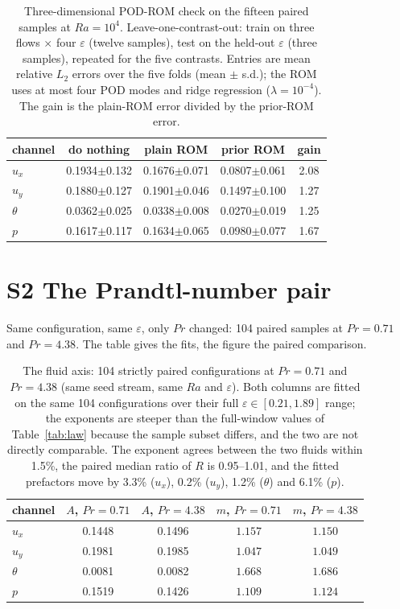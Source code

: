 \documentclass[preprint,11pt,a4paper,times,doubleblind]{elsarticle}
\begin{document}
\begin{table}[htbp]
\centering
\small
\caption{Three-dimensional POD-ROM check on the fifteen paired samples at $Ra=10^4$.
Leave-one-contrast-out: train on three flows $\times$ four $\varepsilon$
(twelve samples), test on the held-out $\varepsilon$ (three samples), repeated
for the five contrasts. Entries are mean relative $L_2$ errors over the five
folds (mean $\pm$ s.d.); the ROM uses at most four POD modes and ridge regression
($\lambda=10^{-4}$). The gain is the plain-ROM error divided by the prior-ROM error.}
\label{tab:3drom}
\begin{tabular}{@{}lcccc@{}}
\toprule
channel & do nothing & plain ROM & prior ROM & gain\\
\midrule
$u_x$ & 0.1934$\pm$0.132 & 0.1676$\pm$0.071 & 0.0807$\pm$0.061 & 2.08\\
$u_y$ & 0.1880$\pm$0.127 & 0.1901$\pm$0.046 & 0.1497$\pm$0.100 & 1.27\\
$\theta$ & 0.0362$\pm$0.025 & 0.0338$\pm$0.008 & 0.0270$\pm$0.019 & 1.25\\
$p$ & 0.1617$\pm$0.117 & 0.1634$\pm$0.065 & 0.0980$\pm$0.077 & 1.67\\
\bottomrule
\end{tabular}
\end{table}

\section*{S2 The Prandtl-number pair}
Same configuration, same $\varepsilon$, only $Pr$ changed: 104 paired samples at
$Pr=0.71$ and $Pr=4.38$. The table gives the fits, the figure the paired comparison.

\begin{table}[htbp]
\centering
\footnotesize
\setlength{\tabcolsep}{3pt}
\caption{The fluid axis: 104 strictly paired configurations at $Pr=0.71$ and $Pr=4.38$ (same seed
stream, same $Ra$ and $\varepsilon$). Both columns are fitted on the same 104 configurations over
their full $\varepsilon\in[0.21,1.89]$ range; the exponents are steeper than the full-window
values of Table~\ref{tab:law} because the sample subset differs, and the two are not directly
comparable. The exponent agrees between the two fluids within 1.5\%, the paired median ratio of $R$ is
0.95--1.01, and the fitted prefactors move by 3.3\% ($u_x$), 0.2\% ($u_y$), 1.2\% ($\theta$) and
6.1\% ($p$).}
\label{tab:water}
\begin{tabular}{@{}lcccc@{}}
\toprule
channel & $A$, $Pr=0.71$ & $A$, $Pr=4.38$ & $m$, $Pr=0.71$ & $m$, $Pr=4.38$\\
\midrule
$u_x$ & 0.1448 & 0.1496 & $1.157$ & $1.150$\\
$u_y$ & 0.1981 & 0.1985 & $1.047$ & $1.049$\\
$\theta$ & 0.0081 & 0.0082 & $1.668$ & $1.686$\\
$p$ & 0.1519 & 0.1426 & $1.109$ & $1.124$\\
\bottomrule
\end{tabular}
\end{table}
\end{document}
